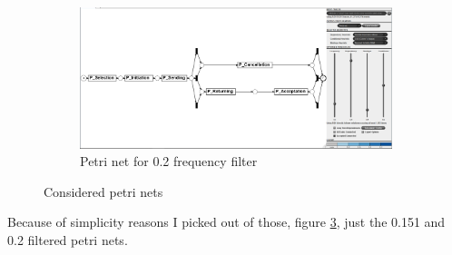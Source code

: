 \begin{figure}[!htbp]
\begin{subfigure}{.4\textwidth}
  \label{fig:P_DFG0-151}
\end{subfigure}
\begin{subfigure}{.4\textwidth}
  \centering
  \includegraphics[width=\linewidth]{P_DirectlyFollowedFreq0-2.PNG}
  \caption{Petri net for 0.2 frequency filter}
  \label{fig:P_DFG0-2}
\end{subfigure}
\caption{Considered petri nets}
\label{fig:P_Direct}
\end{figure}

Because of simplicity reasons I picked out of those, figure \ref{fig:P_Direct}, just the 0.151 and 0.2 filtered petri nets.



